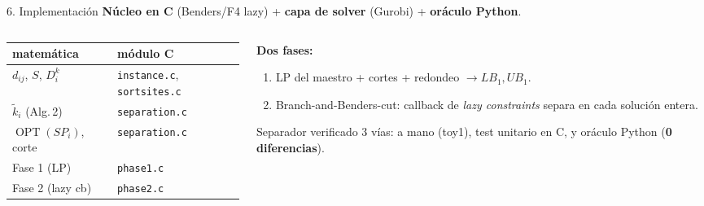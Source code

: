 \documentclass[10pt,aspectratio=169]{beamer}
\DeclareMathOperator*{\OPT}{OPT}
\newcommand{\kt}{\tilde{k}}
\begin{document}
\begin{frame}{6. Implementación}
\textbf{Núcleo en C} (Benders/F4 lazy) + \textbf{capa de solver} (Gurobi) + \textbf{oráculo Python}.
\begin{columns}
\begin{column}{0.5\textwidth}
\small
\begin{tabular}{ll}
\toprule
matemática & módulo C \\
\midrule
$d_{ij}$, $S$, $D^k_i$ & \texttt{instance.c}, \texttt{sortsites.c} \\
$\kt_i$ (Alg.\,2) & \texttt{separation.c} \\
$\OPT(SP_i)$, corte & \texttt{separation.c} \\
Fase 1 (LP) & \texttt{phase1.c} \\
Fase 2 (lazy cb) & \texttt{phase2.c} \\
\bottomrule
\end{tabular}
\end{column}
\begin{column}{0.5\textwidth}
\textbf{Dos fases:}
\begin{enumerate}
  \item LP del maestro + cortes + redondeo $\to LB_1,UB_1$.
  \item Branch-and-Benders-cut: callback de \emph{lazy constraints} separa en cada solución entera.
\end{enumerate}
\alert{Separador verificado 3 vías:} a mano (toy1), test unitario en C, y oráculo Python
(\textbf{0 diferencias}).
\end{column}
\end{columns}
\end{frame}
\end{document}
